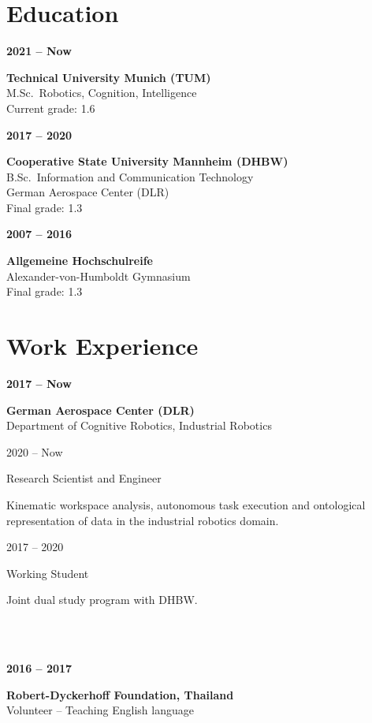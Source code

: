 \documentclass[a4paper, 10pt]{article}
\newcommand{\CVEntry}[3]{
    \begin{minipage}[t]{0.23\textwidth}
        \textbf{#1}
    \end{minipage}%
    \begin{minipage}[t]{0.76\textwidth}
        \textbf{#2}\\
        #3
    \end{minipage}%
}
\newcommand{\CVSubEntry}[2]{
    \begin{minipage}[t]{0.23\textwidth}
        \vspace{3pt}
        \hspace{8pt}#1
    \end{minipage}%
    \begin{minipage}[t]{0.76\textwidth}
        \vspace{3pt}
        #2
    \end{minipage}%
}
\begin{document}
\begin{tcbraster}[raster columns=7]
\begin{tcolorbox}[left=1cm, height=1.0\textheight, colback=white, raster multicolumn=5, boxrule=0pt, frame empty, nobeforeafter]
    \section*{Education}
    \CVEntry{2021 -- Now}{Technical University Munich (TUM)}{
        M.Sc.\ Robotics, Cognition, Intelligence\\
        Current grade: 1.6\\
    }
    \CVEntry{2017 -- 2020}{Cooperative State University Mannheim (DHBW)}{
        B.Sc.\ Information and Communication Technology\\
        German Aerospace Center (DLR)\\
        Final grade: 1.3\\
    }
    \CVEntry{2007 -- 2016}{Allgemeine Hochschulreife}{
        Alexander-von-Humboldt Gymnasium\\
        Final grade: 1.3\\
    }
    \vspace{1.5mm}
    \section*{Work Experience}
    \CVEntry{2017 -- Now}{German Aerospace Center (DLR)}{
        Department of Cognitive Robotics, Industrial Robotics
    }%
    \CVSubEntry{2020 -- Now}{
        Research Scientist and Engineer
        {
            \small\begin{spacing}{0.9}
            Kinematic workspace analysis, autonomous task execution and ontological representation of data in the industrial robotics domain.
            \end{spacing}%
            \vspace{2pt}
        }%
    }%
    \CVSubEntry{2017 -- 2020}{
        Working Student
        {
            \small\begin{spacing}{0.9}
            Joint dual study program with DHBW.
            \end{spacing}%
            \vspace{2pt}
        }
    }\\\\
    \CVEntry{2016 -- 2017}{Robert-Dyckerhoff Foundation, Thailand}{
        Volunteer -- Teaching English language\\
    }
    \vspace{1.5mm}
    \printbibliography[title=Publications]

    \vspace{1.5mm}

\end{tcolorbox}
\end{tcbraster}
\end{document}
